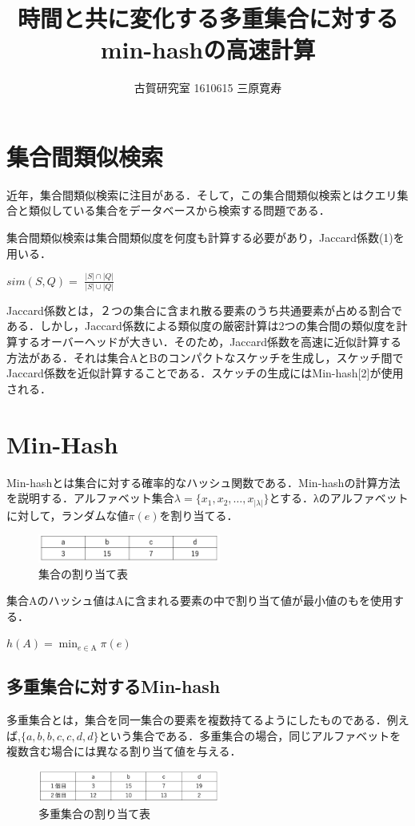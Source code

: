 \documentclass[a4j,twocolumn,dvipdfmx,autodetect-engine]{jsarticle}
\begin{document}
\title{時間と共に変化する多重集合に対するmin-hashの高速計算}
\author{古賀研究室  1610615  三原寛寿}
\maketitle

\section{集合間類似検索}
近年，集合間類似検索に注目がある．そして，この集合間類似検索とはクエリ集合と類似している集合をデータベースから検索する問題である．

集合間類似検索は集合間類似度を何度も計算する必要があり，Jaccard係数(1)を用いる．
\begin{center}
$sim(S,Q)=$ $ \frac {|S| \cap {|Q|} } {|S| \cup {|Q|} }$
\end{center}

Jaccard係数とは，２つの集合に含まれ散る要素のうち共通要素が占める割合である．しかし，Jaccard係数による類似度の厳密計算は2つの集合間の類似度を計算するオーバーヘッドが大きい．そのため，Jaccard係数を高速に近似計算する方法がある．それは集合AとBのコンパクトなスケッチを生成し，スケッチ間でJaccard係数を近似計算することである．スケッチの生成にはMin-hash[2]が使用される．


\section{Min-Hash}
Min-hashとは集合に対する確率的なハッシュ関数である．Min-hashの計算方法を説明する．アルファベット集合$λ=\{x_1,x_2,…,x_|λ|\}$とする．λのアルファベットに対して，ランダムな値$π(e)$を割り当てる．

\begin{figure}[H]
  \centering
  \includegraphics[width=6cm]{1wariate.png}
  \caption{集合の割り当て表}
\end{figure}

集合Aのハッシュ値はAに含まれる要素の中で割り当て値が最小値のもを使用する．
\begin{center}
$h(A)=\min_{e \in \mbox{A}} π(e)$
\end{center}

\subsection{多重集合に対するMin-hash}
多重集合とは，集合を同一集合の要素を複数持てるようにしたものである．例えば,$\{a,b,b,c,c,d,d\}$という集合である．多重集合の場合，同じアルファベットを複数含む場合には異なる割り当て値を与える．
\begin{figure}[H]
  \centering
  \includegraphics[width=6cm]{2wariate.png}
  \caption{多重集合の割り当て表}
\end{figure}
\end{document}
